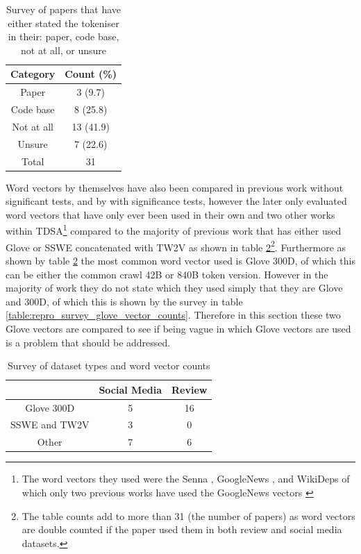 \begin{table}[h!]
    \centering
    \begin{tabular}{|c|c|}
        \hline
        Category & Count (\%) \\
        \hline
        Paper & 3 (9.7)\\
        \hline 
        Code base & 8 (25.8)\\
        \hline 
        Not at all & 13 (41.9)\\
        \hline 
        Unsure & 7 (22.6)\\
        \hline
        Total & 31\\
        \hline
    \end{tabular}
    \caption{Survey of papers that have either stated the tokeniser in their: paper, code base, not at all, or unsure}
    \label{table:repro_tokeniser_survey}
\end{table}

Word vectors by themselves have also been compared in previous work \citep{vo2015target,tang-etal-2016-effective} without significant tests, and by \citet{marrese-taylor-etal-2017-mining} with significance tests, however the later only evaluated word vectors that have only ever been used in their own and two other works within TDSA\footnote{The word vectors they used were the Senna \citep{collobert2011natural}, GoogleNews \citep{mikolov2013distributed}, and WikiDeps \citep{levy-goldberg-2014-dependency} of which only two previous works have used the GoogleNews vectors \citep{nguyen-shirai-2015-phrasernn,wang-etal-2018-target}} compared to the majority of previous work that has either used Glove \citep{pennington-etal-2014-glove} or SSWE concatenated with TW2V as shown in table \ref{table:repro_survey_word_vector_counts}\footnote{The table counts add to more than 31 (the number of papers) as word vectors are double counted if the paper used them in both review and social media datasets.}. Furthermore as shown by table \ref{table:repro_survey_word_vector_counts} the most common word vector used is Glove 300D, of which this can be either the common crawl 42B or 840B token version. However in the majority of work they do not state which they used simply that they are Glove and 300D, of which this is shown by the survey in table \ref{table:repro_survey_glove_vector_counts}. Therefore in this section these two Glove vectors are compared to see if being vague in which Glove vectors are used is a problem that should be addressed.

\begin{table}[h!]
    \centering
    \begin{tabular}{|c|c|c|}
        \hline
         & Social Media & Review  \\
        \hline 
        Glove 300D & 5 & 16 \\
        \hline 
        SSWE and TW2V & 3 & 0 \\
        \hline 
        Other & 7 & 6 \\
        \hline
    \end{tabular}
    \caption{Survey of dataset types and word vector counts}
    \label{table:repro_survey_word_vector_counts}
\end{table}

